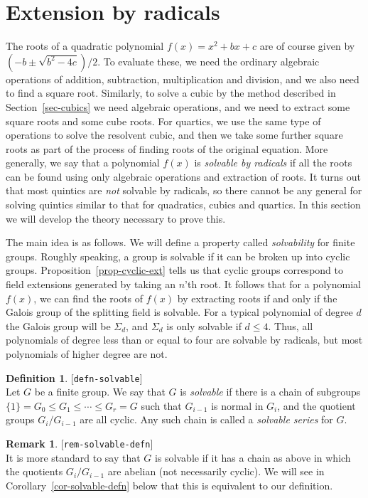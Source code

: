 \documentclass{amsart}
\newcommand{\lbl}[1]{\label{#1}\textup{[\texttt{#1}]}\ \\}
\newcommand{\lbl}{\label}
\newcommand{\Sg}        {\Sigma}
\renewcommand{\:}{\colon}
\theoremstyle{definition}
\newtheorem{remark}[theorem]{Remark}
\newtheorem{definition}[theorem]{Definition}
\begin{document}
\section{Extension by radicals}
\label{sec-radicals}

The roots of a quadratic polynomial $f(x)=x^2+bx+c$ are of course
given by $(-b\pm\sqrt{b^2-4c})/2$.  To evaluate these, we need the
ordinary algebraic operations of addition, subtraction, multiplication
and division, and we also need to find a square root.  Similarly, to
solve a cubic by the method described in Section~\ref{sec-cubics} we
need algebraic operations, and we need to extract some square roots
and some cube roots.  For quartics, we use the same type of operations
to solve the resolvent cubic, and then we take some further square
roots as part of the process of finding roots of the original
equation.  More generally, we say that a polynomial $f(x)$ is
\emph{solvable by radicals} if all the roots can be found using only
algebraic operations and extraction of roots.  It turns out that most
quintics are \emph{not} solvable by radicals, so there cannot be any
general for solving quintics similar to that for quadratics, cubics
and quartics.  In this section we will develop the theory necessary to
prove this.

The main idea is as follows.  We will define a property called
\emph{solvability} for finite groups.  Roughly speaking, a group is
solvable if it can be broken up into cyclic groups.
Proposition~\ref{prop-cyclic-ext} tells us that cyclic groups
correspond to field extensions generated by taking an $n$'th root.  It
follows that for a polynomial $f(x)$, we can find the roots of $f(x)$
by extracting roots if and only if the Galois group of the splitting
field is solvable.  For a typical polynomial of degree $d$ the Galois
group will be $\Sg_d$, and $\Sg_d$ is only solvable if $d\leq 4$.
Thus, all polynomials of degree less than or equal to four are
solvable by radicals, but most polynomials of higher degree are not. 

\begin{definition}\lbl{defn-solvable}
 Let $G$ be a finite group.  We say that $G$ is \emph{solvable} if
 there is a chain of subgroups $\{1\}=G_0\leq G_1\leq\dotsb\leq G_r=G$
 such that $G_{i-1}$ is normal in $G_i$, and the quotient groups
 $G_i/G_{i-1}$ are all cyclic.  Any such chain is called a
 \emph{solvable series} for $G$.
\end{definition}

\begin{remark}\lbl{rem-solvable-defn}
 It is more standard to say that $G$ is solvable if it has a chain as
 above in which the quotients $G_i/G_{i-1}$ are abelian (not
 necessarily cyclic).  We will see in
 Corollary~\ref{cor-solvable-defn} below that this is equivalent to
 our definition.
\end{remark}
\end{document}
